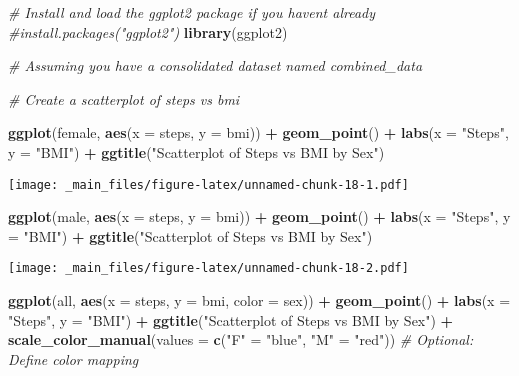 \documentclass[
]{book}
\newenvironment{Shaded}{\begin{snugshade}}{\end{snugshade}}
\newcommand{\AttributeTok}[1]{\textcolor[rgb]{0.13,0.29,0.53}{#1}}
\newcommand{\CommentTok}[1]{\textcolor[rgb]{0.56,0.35,0.01}{\textit{#1}}}
\newcommand{\FunctionTok}[1]{\textcolor[rgb]{0.13,0.29,0.53}{\textbf{#1}}}
\newcommand{\NormalTok}[1]{#1}
\newcommand{\OtherTok}[1]{\textcolor[rgb]{0.56,0.35,0.01}{#1}}
\newcommand{\SpecialCharTok}[1]{\textcolor[rgb]{0.81,0.36,0.00}{\textbf{#1}}}
\newcommand{\StringTok}[1]{\textcolor[rgb]{0.31,0.60,0.02}{#1}}
\begin{document}
\begin{Shaded}
\begin{Highlighting}[]
\CommentTok{\# Install and load the ggplot2 package if you haven\textquotesingle{}t already}
\CommentTok{\#install.packages("ggplot2")}
\FunctionTok{library}\NormalTok{(ggplot2)}

\CommentTok{\# Assuming you have a consolidated dataset named \textquotesingle{}combined\_data\textquotesingle{}}

\CommentTok{\# Create a scatterplot of steps vs bmi}

\FunctionTok{ggplot}\NormalTok{(female, }\FunctionTok{aes}\NormalTok{(}\AttributeTok{x =}\NormalTok{ steps, }\AttributeTok{y =}\NormalTok{ bmi)) }\SpecialCharTok{+}
  \FunctionTok{geom\_point}\NormalTok{() }\SpecialCharTok{+}
  \FunctionTok{labs}\NormalTok{(}\AttributeTok{x =} \StringTok{"Steps"}\NormalTok{, }\AttributeTok{y =} \StringTok{"BMI"}\NormalTok{) }\SpecialCharTok{+}
  \FunctionTok{ggtitle}\NormalTok{(}\StringTok{"Scatterplot of Steps vs BMI by Sex"}\NormalTok{) }
\end{Highlighting}
\end{Shaded}

\texttt{[image: \_main\_files/figure-latex/unnamed-chunk-18-1.pdf]}

\begin{Shaded}
\begin{Highlighting}[]
\FunctionTok{ggplot}\NormalTok{(male, }\FunctionTok{aes}\NormalTok{(}\AttributeTok{x =}\NormalTok{ steps, }\AttributeTok{y =}\NormalTok{ bmi)) }\SpecialCharTok{+}
  \FunctionTok{geom\_point}\NormalTok{() }\SpecialCharTok{+}
  \FunctionTok{labs}\NormalTok{(}\AttributeTok{x =} \StringTok{"Steps"}\NormalTok{, }\AttributeTok{y =} \StringTok{"BMI"}\NormalTok{) }\SpecialCharTok{+}
  \FunctionTok{ggtitle}\NormalTok{(}\StringTok{"Scatterplot of Steps vs BMI by Sex"}\NormalTok{) }
\end{Highlighting}
\end{Shaded}

\texttt{[image: \_main\_files/figure-latex/unnamed-chunk-18-2.pdf]}

\begin{Shaded}
\begin{Highlighting}[]
\FunctionTok{ggplot}\NormalTok{(all, }\FunctionTok{aes}\NormalTok{(}\AttributeTok{x =}\NormalTok{ steps, }\AttributeTok{y =}\NormalTok{ bmi, }\AttributeTok{color =}\NormalTok{ sex)) }\SpecialCharTok{+}
  \FunctionTok{geom\_point}\NormalTok{() }\SpecialCharTok{+}
  \FunctionTok{labs}\NormalTok{(}\AttributeTok{x =} \StringTok{"Steps"}\NormalTok{, }\AttributeTok{y =} \StringTok{"BMI"}\NormalTok{) }\SpecialCharTok{+}
  \FunctionTok{ggtitle}\NormalTok{(}\StringTok{"Scatterplot of Steps vs BMI by Sex"}\NormalTok{) }\SpecialCharTok{+}
  \FunctionTok{scale\_color\_manual}\NormalTok{(}\AttributeTok{values =} \FunctionTok{c}\NormalTok{(}\StringTok{"F"} \OtherTok{=} \StringTok{"blue"}\NormalTok{, }\StringTok{"M"} \OtherTok{=} \StringTok{"red"}\NormalTok{))  }\CommentTok{\# Optional: Define color mapping}
\end{Highlighting}
\end{Shaded}
\end{document}
